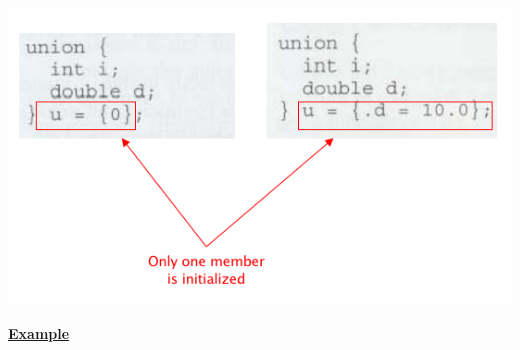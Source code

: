 \documentclass[12pt]{article}
\begin{document}
\begin{enumerate}[1.]
\begin{itemize}
\begin{itemize}
            \begin{center}
            \includegraphics[width=0.6\linewidth]{images/review_7_solution_10.png}
            \end{center}

            \bigskip

            \underline{\textbf{Example}}

            \bigskip
        \end{itemize}
    \end{itemize}

\end{enumerate}
\end{document}
